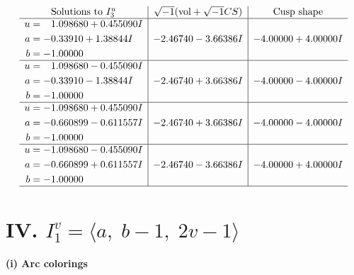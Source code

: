 \documentclass[1p]{elsarticle_modified}
\theoremstyle{definition}
\newcommand{\I}{\sqrt{-1}}
\begin{document}
$$\begin{array}{c|c|c}  
\text{Solutions to }I^u_{3}& \I (\text{vol} + \sqrt{-1}CS) & \text{Cusp shape}\\
 \hline 
\begin{aligned}
u &= \phantom{-}1.098680 + 0.455090 I \\
a &= -0.33910 + 1.38844 I \\
b &= -1.00000\phantom{ +0.000000I}\end{aligned}
 & -2.46740 - 3.66386 I & -4.00000 + 4.00000 I \\ \hline\begin{aligned}
u &= \phantom{-}1.098680 - 0.455090 I \\
a &= -0.33910 - 1.38844 I \\
b &= -1.00000\phantom{ +0.000000I}\end{aligned}
 & -2.46740 + 3.66386 I & -4.00000 - 4.00000 I \\ \hline\begin{aligned}
u &= -1.098680 + 0.455090 I \\
a &= -0.660899 - 0.611557 I \\
b &= -1.00000\phantom{ +0.000000I}\end{aligned}
 & -2.46740 + 3.66386 I & -4.00000 - 4.00000 I \\ \hline\begin{aligned}
u &= -1.098680 - 0.455090 I \\
a &= -0.660899 + 0.611557 I \\
b &= -1.00000\phantom{ +0.000000I}\end{aligned}
 & -2.46740 - 3.66386 I & -4.00000 + 4.00000 I\\
 \hline 
 \end{array}$$\newpage\newpage\renewcommand{\arraystretch}{1}
\centering \section*{IV. $I^v_{1}= \langle a,\;b-1,\;2 v-1 \rangle$}
\flushleft \textbf{(i) Arc colorings}\\
\end{document}
